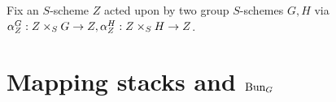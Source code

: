         \begin{remark}
            Fix an $S$-scheme $Z$ acted upon by two group $S$-schemes $G, H$ via $\alpha_Z^G: Z \x_S G \to Z, \alpha_Z^H: Z \x_S H \to Z$.  
        \end{remark}

    \section{Mapping stacks and \texorpdfstring{$\mathrm{Bun}_G$}{}}
    
    \printbibliography

